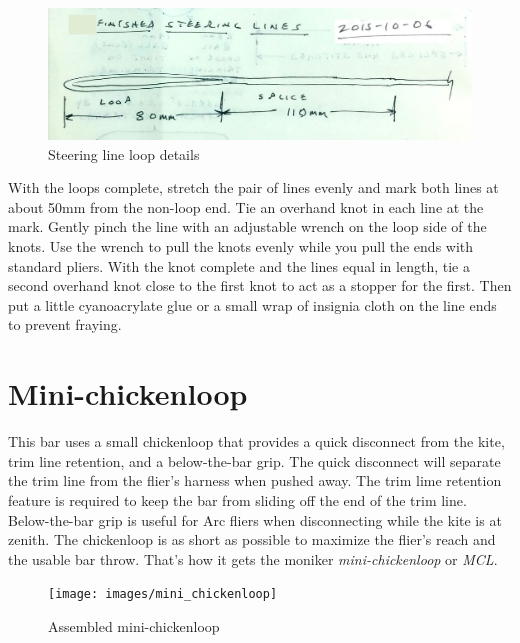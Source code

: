 \documentclass[
]{book}
\begin{document}
\begin{figure}

{\centering \includegraphics[width=0.7\linewidth]{images/04_kite_bar_rigging_2015-10-06_2} 

}

\caption{Steering line loop details}\label{fig:steering-lines}
\end{figure}

With the loops complete, stretch the pair of lines evenly and mark both lines at about 50mm from the non-loop end. Tie an overhand knot in each line at the mark. Gently pinch the line with an adjustable wrench on the loop side of the knots. Use the wrench to pull the knots evenly while you pull the ends with standard pliers. With the knot complete and the lines equal in length, tie a second overhand knot close to the first knot to act as a stopper for the first. Then put a little cyanoacrylate glue or a small wrap of insignia cloth on the line ends to prevent fraying.

\hypertarget{mini-chickenloop}{%
\section{Mini-chickenloop}\label{mini-chickenloop}}

This bar uses a small chickenloop that provides a quick disconnect from the kite, trim line retention, and a below-the-bar grip. The quick disconnect will separate the trim line from the flier's harness when pushed away. The trim lime retention feature is required to keep the bar from sliding off the end of the trim line. Below-the-bar grip is useful for Arc fliers when disconnecting while the kite is at zenith. The chickenloop is as short as possible to maximize the flier's reach and the usable bar throw. That's how it gets the moniker \emph{mini-chickenloop} or \emph{MCL}.

\begin{figure}

{\centering \texttt{[image: images/mini\_chickenloop]} 

}

\caption{Assembled mini-chickenloop }\label{fig:mini-chickenloop}
\end{figure}
\end{document}
